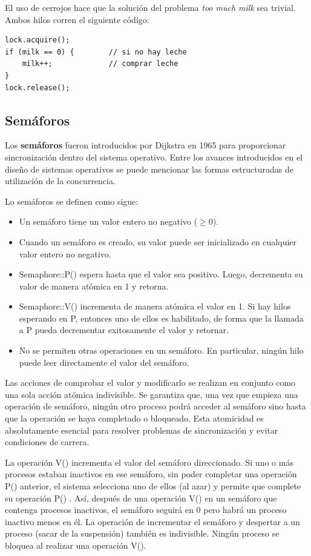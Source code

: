 \documentclass[10pt]{book}
\begin{document}
El uso de cerrojos hace que la solución del problema \textit{too much milk} sea trivial. Ambos hilos corren el siguiente código:

\begin{lstlisting}
lock.acquire();
if (milk == 0) {		// si no hay leche
	milk++;				// comprar leche
}
lock.release();
\end{lstlisting}

\subsection{Semáforos}
Los \textbf{semáforos} fueron introducidos por Dijkstra en 1965 para proporcionar sincronización dentro del sistema operativo. Entre los avances introducidos en el diseño de sistemas operativos se puede mencionar las formas estructuradas de utilización de la concurrencia.

Lo semáforos se definen como sigue:
\begin{itemize}
\item Un semáforo tiene un valor entero no negativo ($\geq 0$).
\item Cuando un semáforo es creado, su valor puede ser inicializado en cualquier valor entero no negativo.
\item {\mf Semaphore::P()} espera hasta que el valor sea positivo. Luego, decrementa su valor de manera atómica en 1 y retorna.
\item {\mf Semaphore::V()} incrementa de manera atómica el valor en 1. Si hay hilos esperando en {\mf P}, entonces uno de ellos es habilitado, de forma que la llamada a {\mf P} pueda decrementar exitosamente el valor y retornar.
\item No se permiten otras operaciones en un semáforo. En particular, ningún hilo puede leer directamente el valor del semáforo.
\end{itemize}

Las acciones de comprobar el valor y modificarlo se realizan en conjunto como una sola acción atómica indivisible. Se garantiza que, una vez que empieza una operación de semáforo, ningún otro proceso podrá acceder al semáforo sino hasta que la operación se haya completado o bloqueado. Esta atomicidad es absolutamente esencial para resolver problemas de sincronización y evitar condiciones de carrera.

La operación {\mf V()} incrementa el valor del semáforo direccionado. Si uno o más procesos estaban inactivos en ese semáforo, sin poder completar una operación {\mf P()} anterior, el sistema selecciona uno de ellos (al azar) y permite que complete su operación {\mf P()} . Así, después de una operación {\mf V()} en un semáforo que contenga procesos inactivos, el semáforo seguirá en 0 pero habrá un proceso inactivo menos en él. La operación de incrementar el semáforo y despertar a un proceso (sacar de la suspensión) también es indivisible. Ningún proceso se bloquea al realizar una operación {\mf V()}.
\end{document}
